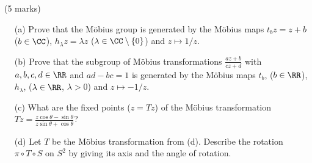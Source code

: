 \documentclass[12pt]{article}
\begin{document}
\begin{question}\ (5 marks)\\
  \begin{enumerate}
  \item[(a)] Prove that the M\"obius group is generated by the M\"obius maps $t_bz=z+b$ ($b\in\CC$), $h_\lambda z=\lambda z$ ($\lambda\in\CC\setminus\{0\}$) and $z\mapsto 1/z$.
  \item[(b)] Prove that the subgroup of M\"obius transformations $\frac{az+b}{cz+d}$ with $a,b,c,d\in\RR$ and $ad-bc=1$ is generated by the M\"obius maps $t_b$, ($b\in\RR$), $h_\lambda$, ($\lambda\in\RR$, $\lambda>0$) and $z\mapsto -1/z$.
  \item[(c)] What are the fixed points ($z=Tz$) of the M\"obius transformation $Tz=\frac{z\cos\theta-\sin\theta}{z\sin\theta+\cos\theta}$?
  \item[(d)] Let $T$ be the M\"obius transformation from (d). Describe the rotation $\pi\circ T\circ S$ on $S^2$ by giving its axis and the angle of rotation.
  \end{enumerate}
\end{question}
\iffalse
\begin{answer}
  \begin{enumerate}
  \item[(a)] We have
    \[t_{\alpha}(h_{\beta}(r(t_d(h_c(z)))))=\alpha+\frac{\beta}{cz+d}=\frac{\alpha cz+\beta+\alpha d}{cz+d},\]
    (where $r(z)=1/z$) so if we pick $\alpha=a/c$ and $\beta=b-ad/c$ then we get $(az+b)/(cz+d)$ as required.
  \item[(b)] Note that all of the transformations in question live in the group $PSL(2,\RR)$: for example, $h_\lambda(z)=\sqrt{\lambda}z/(1/\sqrt{\lambda})$ so we can take $a=1/d=\sqrt{\lambda}$, $b=c=0$, which has $ad-bc=1$. The only difference from part 1 is that we need to use $-r$ and can only rescale by positive numbers, so:
    \begin{itemize}
    \item if $c>0$, we need to pick $\beta=-b+ad/c=1/c>0$.
    \item if $c<0$ we need to use $h_{-c}$, $t_{-d}$ and $\beta=b-ad/c$.
    \end{itemize}
  \item[(c)] We have $z=Tz$ if and only if $z\cos\theta-\sin\theta=z^2\sin\theta+z\cos\theta$, i.e. $z^2=-1$. Therefore the fixed points are $\pm i$.
  \item[(d)] Since $\pi(\pm i)=(0,\pm 1,0)$, the fixed points of $g=\pi\circ T\circ S$ are $(0,\pm 1,0)$ so $g$ is a rotation around the $y$-axis. We have $\pi(1)=(1,0,0)$ and $T(1)=\frac{\cos\theta-\sin\theta}{\cos\theta+\sin\theta}=\frac{1-\tan\theta}{1+\tan\theta}$ so $\pi(T(1))$ has $x_3$-coordinate $\frac{1-\left(\frac{1-\tan\theta}{1+\tan\theta}\right)^2}{1+\left(\frac{1-\tan\theta}{1+\tan\theta}\right)^2}=\frac{2\tan\theta}{1+\tan^2\theta}=\sin 2\theta$, $x_2$-coordinate zero and $x_1$-coordinate $\cos 2\theta$, we see that this is a rotation by $2\theta$ around the $y$-axis.
  \end{enumerate}
\end{answer}
\fi
\end{document}
